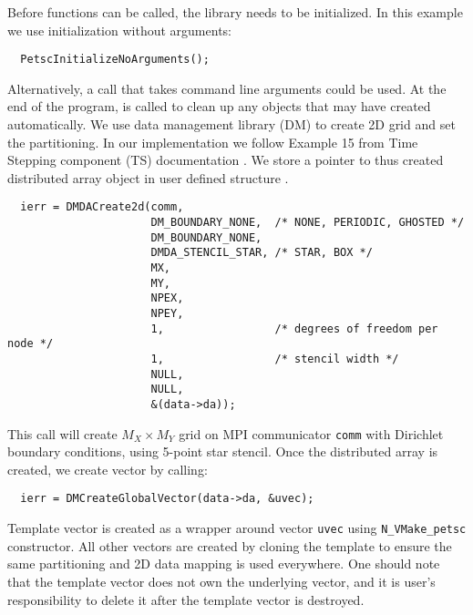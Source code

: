 Before {\petsc} functions can be called, the library needs to be initialized. 
In this example we use initialization without arguments:
\begin{verbatim}
  PetscInitializeNoArguments(); 
\end{verbatim}
Alternatively, a call that takes {\petsc} command line arguments could be used.
At the end of the program,  is called  to clean up any 
objects that {\petsc} may have created automatically. 
We use {\petsc} data management library (DM) to create 2D grid and set 
the partitioning. In our implementation we follow Example 15 from 
{\petsc} Time Stepping component (TS) documentation \cite{petsc-web-page}. 
We store a pointer to thus created {\petsc} distributed array object 
in user defined structure .
\begin{verbatim}
  ierr = DMDACreate2d(comm, 
                      DM_BOUNDARY_NONE,  /* NONE, PERIODIC, GHOSTED */
                      DM_BOUNDARY_NONE,
                      DMDA_STENCIL_STAR, /* STAR, BOX */
                      MX,                
                      MY,                
                      NPEX,              
                      NPEY,              
                      1,                 /* degrees of freedom per node */
                      1,                 /* stencil width */
                      NULL,              
                      NULL,              
                      &(data->da));
\end{verbatim}
This call will create $M_X \times M_Y$ grid on MPI communicator \verb|comm|
with Dirichlet boundary conditions, using 5-point star stencil. Once 
the distributed array is created, we create {\petsc} vector by calling:
\begin{verbatim}
  ierr = DMCreateGlobalVector(data->da, &uvec);
\end{verbatim}
Template vector  is created as a wrapper around {\petsc} vector 
\verb|uvec| using \verb|N_VMake_petsc| constructor. All other vectors are 
created by cloning the template to ensure the same partitioning and 2D data 
mapping is used everywhere. One should note that the template vector does 
not own the underlying {\petsc} vector, and it is user's responsibility to 
delete it after the template vector is destroyed.

